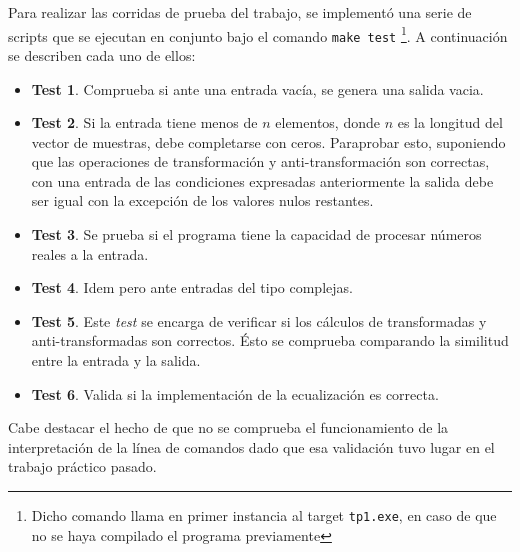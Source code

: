 
Para realizar las corridas de prueba del trabajo, se implementó una serie de scripts que se ejecutan en conjunto bajo el comando \texttt{make test} \footnote{Dicho comando llama en primer instancia al target \texttt{tp1.exe}, en caso de que no se haya compilado el programa previamente}. A continuación se describen cada uno de ellos:

	\begin{itemize}
		\item \textbf{Test 1}. Comprueba si ante una entrada vacía, se genera una salida vacia.
		\item \textbf{Test 2}. Si la entrada tiene menos de $n$ elementos, donde $n$ es la longitud del vector de muestras, debe completarse con ceros. Paraprobar esto, suponiendo que las operaciones de transformación y anti-transformación son correctas, con una entrada de las condiciones expresadas anteriormente la salida debe ser igual con la excepción de los valores nulos restantes.
		\item \textbf{Test 3}. Se prueba si el programa tiene la capacidad de procesar números reales a la entrada.
		\item \textbf{Test 4}. Idem pero ante entradas del tipo complejas.
		\item \textbf{Test 5}. Este \emph{test} se encarga de verificar si los cálculos de transformadas y anti-transformadas son correctos. Ésto se comprueba comparando la similitud entre la entrada y la salida.
		\item \textbf{Test 6}. Valida si la implementación de la ecualización es correcta.
	\end{itemize}

Cabe destacar el hecho de que no se comprueba el funcionamiento de la interpretación de la línea de comandos dado que esa validación tuvo lugar en el trabajo práctico pasado.

